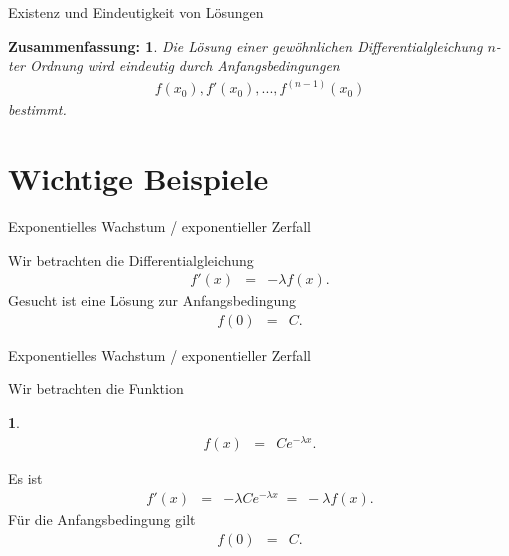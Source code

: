 \documentclass[german]{beamer}
\newcommand{\bq}{\begin{eqnarray*}}
\newcommand{\eq}{\end{eqnarray*}}
\newcommand{\superalert}[1]{{\color{MyYellowOrange}{#1}}}
\newtheorem*{myemptytheorem}{}
\newtheorem*{mytheorem28}{Zusammenfassung:}
\begin{document}
\begin{frame}{Existenz und Eindeutigkeit von L\"osungen}

\begin{mytheorem28}
Die L\"osung einer gew\"ohnlichen Differentialgleichung $n$-ter Ordnung
wird eindeutig durch \superalert{$n$} Anfangsbedingungen 
\bq
 f(x_0), f'(x_0), ..., f^{(n-1)}(x_0)
\eq
bestimmt.
\end{mytheorem28}

\end{frame}


\section{Wichtige Beispiele}

\frame{\sectionpage}

\begin{frame}{Exponentielles Wachstum / exponentieller Zerfall}

\begin{example}
Wir betrachten die Differentialgleichung
\bq
 f'(x) & = & -\lambda f(x).
\eq
Gesucht ist eine L\"osung zur Anfangsbedingung
\bq
 f(0) & = & C.
\eq
\end{example}

\end{frame}

\begin{frame}{Exponentielles Wachstum / exponentieller Zerfall}

Wir betrachten die Funktion
\begin{myemptytheorem}
\bq
 f\left(x\right) & = & C e^{-\lambda x}.
\eq
\end{myemptytheorem}
Es ist
\bq
 f'\left(x\right) & = & - \lambda C e^{-\lambda x}
 \; = \; 
 - \lambda f\left(x\right).
\eq
F\"ur die Anfangsbedingung gilt
\bq
 f\left(0\right) & = & C.
\eq

\end{frame}
\end{document}
